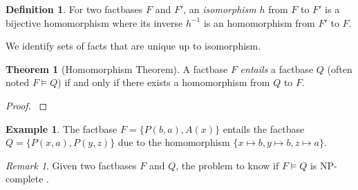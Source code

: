 \documentclass{article}
\theoremstyle{definition}
\newtheorem{definition}{Definition}[section]
\newtheorem{theorem}{Theorem}[section]
\newtheorem{example}{Example}[section]
\theoremstyle{remark}
\newtheorem{remark}{Remark}[section]
\begin{document}
\begin{definition}
For two factbases $F$ and $F'$, an \emph{isomorphism} $h$ from $F$ to $F'$ is a bijective homomorphism where its inverse $h^{-1}$ is an homomorphism from $F'$ to $F$. 
\end{definition}

We identify sets of facts that are unique up to isomorphism.


\begin{theorem}[Homomorphism Theorem]
A factbase $F$ \emph{entails} a factbase $Q$ (often noted $F \models Q$) if and only if there exists a homomorphism from $Q$ to $F$.
\end{theorem}

\begin{proof}
\cite{base}
\end{proof}

\begin{example}
The factbase $F = \{P(b,a),A(x)\}$ entails the factbase $Q = \{P(x,a),P(y,z)\}$ due to the homomorphism $\{x \mapsto b, y \mapsto b, z \mapsto a \}$.
\end{example}

\begin{remark}
Given two factbases $F$ and $Q$, the problem to know if $F \models Q$ is NP-complete \cite{NP}. 
\end{remark}
\end{document}

